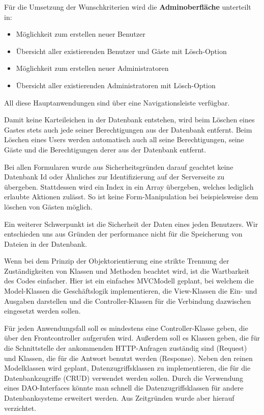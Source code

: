 \documentclass[10pt]{article}
\begin{document}
Für die Umsetzung der Wunschkriterien wird die \textbf{Adminoberfläche} unterteilt in:
\begin{itemize}
	\item Möglichkeit zum erstellen neuer Benutzer
	\item Übersicht aller existierenden Benutzer und Gäste mit Lösch-Option
	\item Möglichkeit zum erstellen neuer Administratoren
	\item Übersicht aller existierenden Administratoren mit Lösch-Option
\end{itemize}

All diese Hauptanwendungen sind über eine Navigationsleiste verfügbar.

Damit keine Karteileichen in der Datenbank entstehen, wird beim Löschen eines Gastes stets auch jede seiner Berechtigungen aus der Datenbank entfernt. Beim Löschen eines Users werden automatisch auch all seine Berechtigungen, seine Gäste und die Berechtigungen derer aus der Datenbank entfernt.

Bei allen Formularen wurde aus Sicherheitsgründen darauf geachtet keine Datenbank Id oder Ähnliches zur Identifizierung auf der Serverseite zu übergeben. Stattdessen wird ein Index in ein Array übergeben, welches lediglich erlaubte Aktionen zulässt. So ist keine Form-Manipulation bei beispielsweise dem löschen von Gästen möglich.

Ein weiterer Schwerpunkt ist die Sicherheit der Daten eines jeden Benutzers. Wir entschieden uns aus Gründen der performance nicht für die Speicherung von Dateien in der Datenbank.

Wenn bei dem Prinzip der Objektorientierung eine strikte Trennung der Zuständigkeiten von Klassen und Methoden beachtet wird, ist die Wartbarkeit des Codes einfacher. Hier ist ein einfaches MVCModell geplant, bei welchem die Model-Klassen die Geschäftslogik implementieren, die View-Klassen die Ein- und Ausgaben darstellen und die Controller-Klassen für die Verbindung dazwischen eingesetzt werden sollen. 

 Für jeden Anwendungsfall soll es mindestens eine Controller-Klasse geben, die über den Frontcontroller aufgerufen wird. Außerdem soll es Klassen geben, die für die Schnittstelle der ankommenden HTTP-Anfragen zuständig sind (Request) und Klassen, die für die Antwort benutzt werden (Response). Neben den reinen Modelklassen wird geplant, Datenzugriffsklassen zu implementieren, die für die Datenbankzugriffe (CRUD) verwendet werden sollen. Durch die Verwendung eines DAO-Interfaces könnte man schnell die Datenzugriffsklassen für andere Datenbanksysteme erweitert werden. Aus Zeitgründen wurde aber hierauf verzichtet. 
\end{document}
